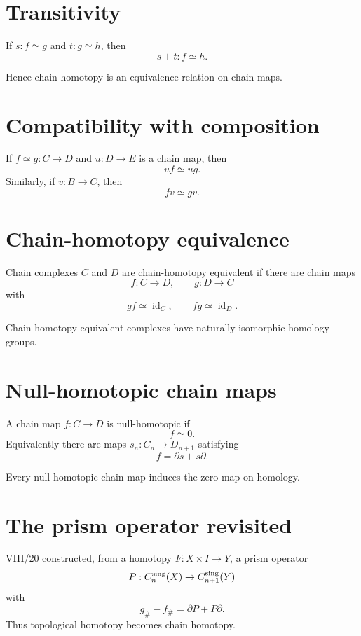 \section{Transitivity}
If \(s:f\simeq g\) and \(t:g\simeq h\), then
\[
s+t:f\simeq h.
\]

Hence chain homotopy is an equivalence relation on chain maps.

\section{Compatibility with composition}
If \(f\simeq g:C\to D\) and \(u:D\to E\) is a chain map, then
\[
uf\simeq ug.
\]
Similarly, if \(v:B\to C\), then
\[
fv\simeq gv.
\]

\section{Chain-homotopy equivalence}
\begin{definition}
\label{def:viii22-chain-equivalence}
Chain complexes \(C\) and \(D\) are chain-homotopy equivalent if there are
chain maps
\[
f:C\to D,\qquad g:D\to C
\]
with
\[
gf\simeq\operatorname{id}_C,
\qquad
fg\simeq\operatorname{id}_D.
\]
\end{definition}

\begin{theorem}
\label{thm:viii22-chain-equivalence-homology}
Chain-homotopy-equivalent complexes have naturally isomorphic homology groups.
\end{theorem}

\section{Null-homotopic chain maps}
A chain map \(f:C\to D\) is null-homotopic if
\[
f\simeq0.
\]
Equivalently there are maps \(s_n:C_n\to D_{n+1}\) satisfying
\[
f=\partial s+s\partial.
\]

Every null-homotopic chain map induces the zero map on homology.

\section{The prism operator revisited}
VIII/20 constructed, from a homotopy \(F:X\times I\to Y\), a prism operator
\[
P:C_n^{\rm sing}(X)\to C_{n+1}^{\rm sing}(Y)
\]
with
\[
g_\#-f_\#=\partial P+P\partial.
\]
Thus topological homotopy becomes chain homotopy.

